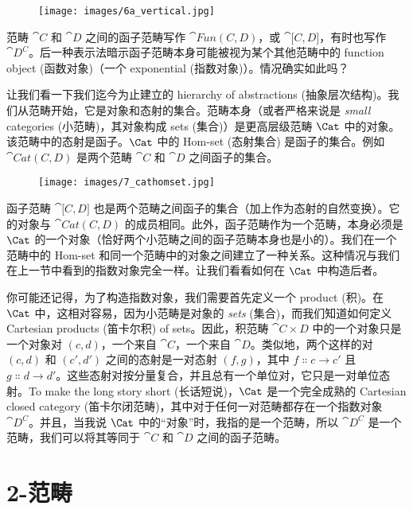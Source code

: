 \begin{figure}[H]
  \centering
  \texttt{[image: images/6a\_vertical.jpg]}
\end{figure}

\noindent
范畴 $\cat{C}$ 和 $\cat{D}$ 之间的函子范畴写作 $\cat{Fun(C, D)}$，或 $\cat{{[}C, D{]}}$，有时也写作 $\cat{D^C}$。后一种表示法暗示函子范畴本身可能被视为某个其他范畴中的 function object (函数对象)（一个 exponential (指数对象)）。情况确实如此吗？

让我们看一下我们迄今为止建立的 hierarchy of abstractions (抽象层次结构)。我们从范畴开始，它是对象和态射的集合。范畴本身（或者严格来说是 \emph{small} categories (小范畴)，其对象构成 sets (集合)）是更高层级范畴 $\Cat$ 中的对象。该范畴中的态射是函子。$\Cat$ 中的 Hom-set (态射集合) 是函子的集合。例如 $\cat{Cat(C, D)}$ 是两个范畴 $\cat{C}$ 和 $\cat{D}$ 之间函子的集合。

\begin{figure}[H]
  \centering
  \texttt{[image: images/7\_cathomset.jpg]}
\end{figure}

\noindent
函子范畴 $\cat{{[}C, D{]}}$ 也是两个范畴之间函子的集合（加上作为态射的自然变换）。它的对象与 $\cat{Cat(C, D)}$ 的成员相同。此外，函子范畴作为一个范畴，本身必须是 $\Cat$ 的一个对象（恰好两个小范畴之间的函子范畴本身也是小的）。我们在一个范畴中的 Hom-set 和同一个范畴中的对象之间建立了一种关系。这种情况与我们在上一节中看到的指数对象完全一样。让我们看看如何在 $\Cat$ 中构造后者。

你可能还记得，为了构造指数对象，我们需要首先定义一个 product (积)。在 $\Cat$ 中，这相对容易，因为小范畴是对象的 \emph{sets} (集合)，而我们知道如何定义 Cartesian products (笛卡尔积) of sets。因此，积范畴 $\cat{C\times D}$ 中的一个对象只是一个对象对 $(c, d)$，一个来自 $\cat{C}$，一个来自 $\cat{D}$。类似地，两个这样的对 $(c, d)$ 和 $(c', d')$ 之间的态射是一对态射 $(f, g)$，其中 $f \Colon c \to c'$ 且 $g \Colon d \to d'$。这些态射对按分量复合，并且总有一个单位对，它只是一对单位态射。To make the long story short (长话短说)，$\Cat$ 是一个完全成熟的 Cartesian closed category (笛卡尔闭范畴)，其中对于任何一对范畴都存在一个指数对象 $\cat{D^C}$。并且，当我说 $\Cat$ 中的“对象”时，我指的是一个范畴，所以 $\cat{D^C}$ 是一个范畴，我们可以将其等同于 $\cat{C}$ 和 $\cat{D}$ 之间的函子范畴。

\section{2-范畴}

